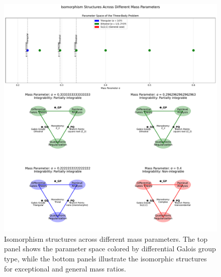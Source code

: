 
\begin{figure}[htbp]
  \centering
  \includegraphics[width=\textwidth]{isomorphism_comparison.pdf}
  \caption{Isomorphism structures across different mass parameters. The top panel shows the parameter space colored by differential Galois group type, while the bottom panels illustrate the isomorphic structures for exceptional and general mass ratios.}
  \label{fig:isomorphism_comparison}
\end{figure}

